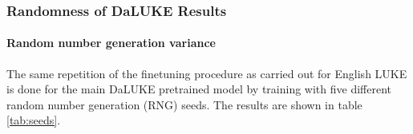 \documentclass[main.tex]{subfiles}
\begin{document}
\subsubsection{Randomness of DaLUKE Results}
\paragraph{Random number generation variance}

The same repetition of the finetuning procedure as carried out for English LUKE is done for the main DaLUKE pretrained model by training with five different random number generation (RNG) seeds.
The results are shown in table \ref{tab:seeds}.










\end{document}
